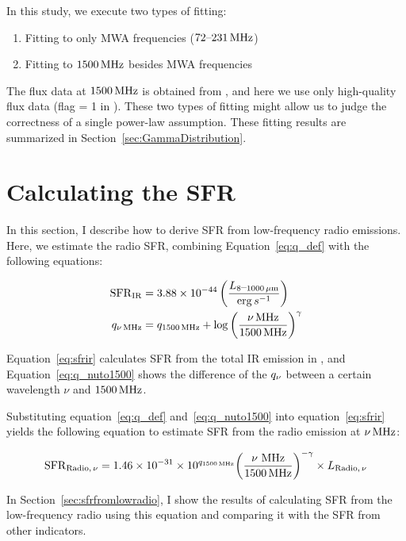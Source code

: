 In this study, we execute two types of fitting:

\begin{enumerate}
    \item Fitting to only MWA frequencies ($72\mbox{--}231\,\mathrm{MHz}$)
    \item Fitting to $1500\,\mathrm{MHz}$ besides MWA frequencies
\end{enumerate}

The flux data at $1500\,\mathrm{MHz}$ is obtained from \citet{Boselli2015}, and here we use only high-quality flux data (flag = 1 in \citealt{Boselli2015}).
These two types of fitting might allow us to judge the correctness of a single power-law assumption.
These fitting results are summarized in Section~\ref{sec:GammaDistribution}.



\section{Calculating the SFR}\label{sec:calculatingsfr}
In this section, I describe how to derive SFR from low-frequency radio emissions.\\
Here, we estimate the radio SFR, combining Equation~\ref{eq:q_def} with the following equations:

\begin{align}
    \mathrm{SFR}_{\mathrm{IR}} &= 3.88 \times 10^{-44}\left(\frac{L_{\mathrm{8\mbox{--}1000\,\mu m}}}{\mathrm{erg}\,s^{-1}}\right)\label{eq:sfrir}\\
    q_{\nu\,\mathrm{MHz}} &= q_{\mathrm{1500\,\mathrm{MHz}}} + \log{\left(\frac{\nu\,\mathrm{MHz}}{1500\,\mathrm{MHz}}\right)}^{\gamma}\label{eq:q_nuto1500}
\end{align}

Equation~\ref{eq:sfrir} calculates SFR from the total IR emission in \citet{Murphy2011}, and Equation~\ref{eq:q_nuto1500} shows the difference of the $q_{\nu}$ between a certain wavelength $\nu$ and $1500\,\mathrm{MHz}$.

Substituting equation~\ref{eq:q_def} and~\ref{eq:q_nuto1500} into equation~\ref{eq:sfrir} yields the following equation to estimate SFR from the radio emission at $\nu\,\mathrm{MHz}$:

\begin{equation}\label{eq:sfrfromradio}
    \mathrm{SFR}_{\mathrm{Radio},\,\nu} = 1.46\times10^{-31}\times 10^{q_{\mathrm{1500\,\mathrm{MHz}}}} {\left(\frac{\nu\,\,\mathrm{MHz}}{1500\,\mathrm{MHz}}\right)}^{-\gamma} \times L_{\mathrm{Radio},\,\nu}
\end{equation}

In Section~\ref{sec:sfrfromlowradio}, I show the results of calculating SFR from the low-frequency radio using this equation and comparing it with the SFR from other indicators.



%
%
